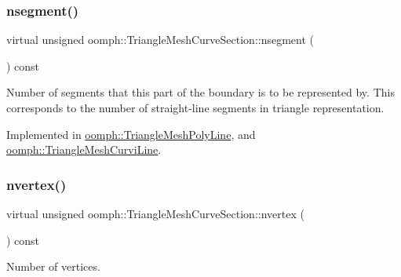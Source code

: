 \mbox{\label{classoomph_1_1TriangleMeshCurveSection_a52af59a9a4f1b6adb35e5645ab8feb45}} 
\subsubsection{\texorpdfstring{nsegment()}{nsegment()}}
{\footnotesize\ttfamily virtual unsigned oomph\+::\+Triangle\+Mesh\+Curve\+Section\+::nsegment (\begin{DoxyParamCaption}{ }\end{DoxyParamCaption}) const\hspace{0.3cm}{\ttfamily [pure virtual]}}



Number of segments that this part of the boundary is to be represented by. This corresponds to the number of straight-\/line segments in triangle representation. 



Implemented in \hyperlink{classoomph_1_1TriangleMeshPolyLine_a51af74c24abbae9b2cc881946d8f2170}{oomph\+::\+Triangle\+Mesh\+Poly\+Line}, and \hyperlink{classoomph_1_1TriangleMeshCurviLine_af5ee48a8cb78c2c2954a14241b5b1489}{oomph\+::\+Triangle\+Mesh\+Curvi\+Line}.

\mbox{\label{classoomph_1_1TriangleMeshCurveSection_a491d849e8147152c10d55c8ca6c3d63d}} 
\subsubsection{\texorpdfstring{nvertex()}{nvertex()}}
{\footnotesize\ttfamily virtual unsigned oomph\+::\+Triangle\+Mesh\+Curve\+Section\+::nvertex (\begin{DoxyParamCaption}{ }\end{DoxyParamCaption}) const\hspace{0.3cm}{\ttfamily [pure virtual]}}



Number of vertices. 



